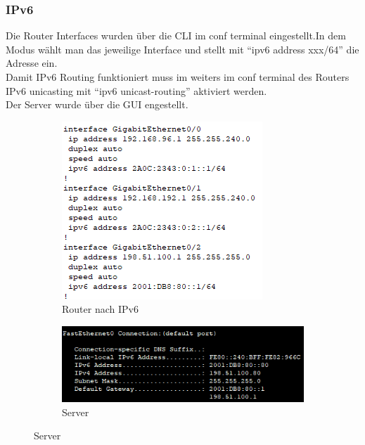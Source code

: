 \subsubsection{IPv6}
Die Router Interfaces wurden über die CLI im conf terminal eingestellt.In dem Modus wählt man das jeweilige Interface und stellt mit ``ipv6 address xxx/64'' die Adresse ein.\\
Damit IPv6 Routing funktioniert muss im weiters im conf terminal des Routers IPv6 unicasting mit ``ipv6 unicast-routing'' aktiviert werden.\\
Der Server wurde über die GUI engestellt.
\begin{figure}[!htb]
    \centering
    \begin{subfigure}{.49\textwidth}
        \includegraphics[width=\textwidth,height=.7\textwidth,keepaspectratio]{./img/config/router_ipv6.png}
        \caption{Router nach IPv6}
    \end{subfigure}
    \begin{subfigure}{.49\textwidth}
        \includegraphics[width=\textwidth,height=.4\textwidth,keepaspectratio]{./img/config/server.png}
        \caption{Server}
    \end{subfigure}
\end{figure}


